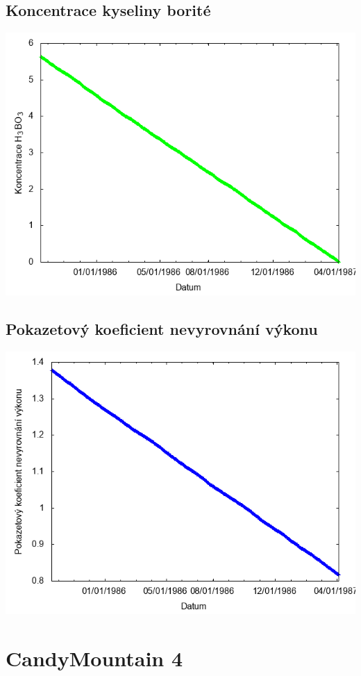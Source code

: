 \documentclass[a4paper,twoside,11pt]{article}
\begin{document}
\subsection*{Koncentrace kyseliny borité}
\begin{center}
\includegraphics[width=.8\textwidth]{graphs/CandyMountain_03_bc.png}
\end{center}

\subsection*{Pokazetový koeficient nevyrovnání výkonu}
\begin{center}
\includegraphics[width=.8\textwidth]{graphs/CandyMountain_03_fha.png}
\end{center}

\newpage
\section*{CandyMountain 4}
\end{document}
